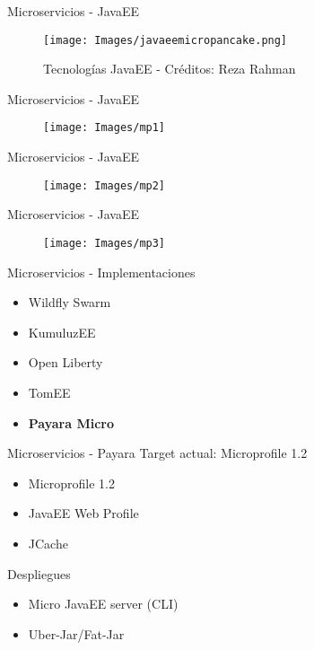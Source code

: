 \documentclass{beamer}
\begin{document}
\begin{frame}{Microservicios - JavaEE}

\begin{figure}
	\centering
	\texttt{[image: Images/javaeemicropancake.png]}
	\caption{Tecnologías JavaEE - Créditos: Reza Rahman}
\end{figure}
\end{frame}

\begin{frame}{Microservicios - JavaEE}
\begin{figure}
	\centering
	\texttt{[image: Images/mp1]}
\end{figure}
\end{frame}

\begin{frame}{Microservicios - JavaEE}
\begin{figure}
	\centering
	\texttt{[image: Images/mp2]}
\end{figure}
\end{frame}

\begin{frame}{Microservicios - JavaEE}
\begin{figure}
	\centering
	\texttt{[image: Images/mp3]}
\end{figure}
\end{frame}

\begin{frame}{Microservicios - Implementaciones}
\begin{itemize}
	\item Wildfly Swarm
	\item KumuluzEE
	\item Open Liberty
	\item TomEE
	\item \textbf{Payara Micro}
\end{itemize}
\end{frame}

\begin{frame}{Microservicios - Payara}
Target actual: Microprofile 1.2 

\begin{itemize}
	\item Microprofile 1.2 
	\item JavaEE Web Profile
	\item JCache
\end{itemize}

Despliegues
\begin{itemize}
	\item Micro JavaEE server (CLI)
	\item Uber-Jar/Fat-Jar
\end{itemize}
\end{frame}
\end{document}
